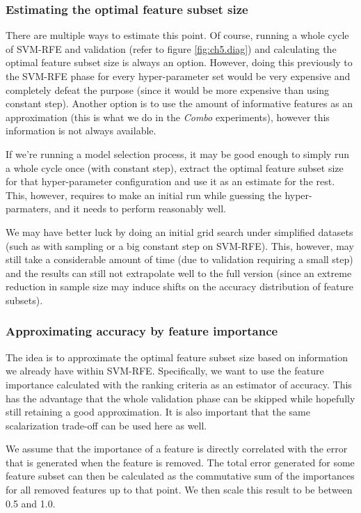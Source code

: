 \subsubsection*{Estimating the optimal feature subset size}

There are multiple ways to estimate this point. Of course, running a whole cycle of SVM-RFE and validation (refer to figure \ref{fig:ch5.diag}) and calculating the optimal feature subset size is always an option. However, doing this previously to the SVM-RFE phase for every hyper-parameter set would be very expensive and completely defeat the purpose (since it would be more expensive than using constant step). Another option is to use the amount of informative features as an approximation (this is what we do in the \emph{Combo} experiments), however this information is not always available.

If we're running a model selection process, it may be good enough to simply run a whole cycle once (with constant step), extract the optimal feature subset size for that hyper-parameter configuration and use it as an estimate for the rest. This, however, requires to make an initial run while guessing the hyper-parmaters, and it needs to perform reasonably well. 

We may have better luck by doing an initial grid search under simplified datasets (such as with sampling or a big constant step on SVM-RFE). This, however, may still take a con\-sid\-er\-able amount of time (due to validation requiring a small step) and the results can still not extrapolate well to the full version (since an extreme reduction in sample size may induce shifts on the accuracy distribution of feature subsets).

\subsubsection*{Approximating accuracy by feature importance}

The idea is to approximate the optimal feature subset size based on information we already have within SVM-RFE. Specifically, we want to use the feature importance calculated with the ranking criteria as an estimator of accuracy. This has the ad\-van\-tage that the whole validation phase can be skipped while hopefully still retaining a good approximation. It is also important that the same scalarization trade-off can be used here as well.

We assume that the importance of a feature is directly correlated with the error that is generated when the feature is removed. The total error generated for some feature subset can then be calculated as the commutative sum of the im\-por\-tances for all removed features up to that point. We then scale this result to be between 0.5 and 1.0.

